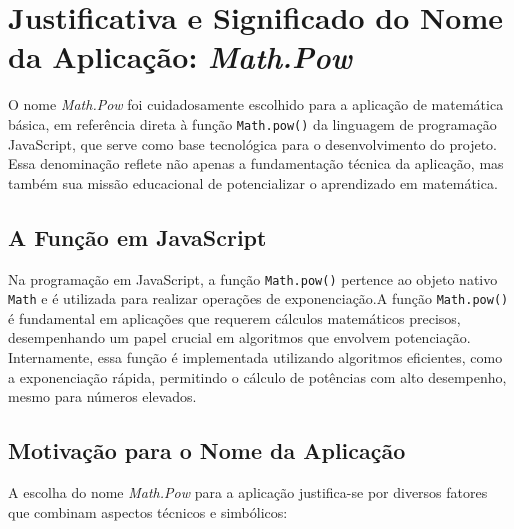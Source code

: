 \section{Justificativa e Significado do Nome da Aplicação: \textit{Math.Pow}} 

O nome \textit{Math.Pow} foi cuidadosamente escolhido para a aplicação de matemática básica, em referência direta à função \texttt{Math.pow()} da linguagem de programação JavaScript, que serve como base tecnológica para o desenvolvimento do projeto. Essa denominação reflete não apenas a fundamentação técnica da aplicação, mas também sua missão educacional de potencializar o aprendizado em matemática.

\subsection{A Função  em JavaScript}

Na programação em JavaScript, a função \texttt{Math.pow()} pertence ao objeto nativo \texttt{Math} e é utilizada para realizar operações de exponenciação.A função \texttt{Math.pow()} é fundamental em aplicações que requerem cálculos matemáticos precisos, desempenhando um papel crucial em algoritmos que envolvem potenciação. Internamente, essa função é implementada utilizando algoritmos eficientes, como a exponenciação rápida, permitindo o cálculo de potências com alto desempenho, mesmo para números elevados.

\subsection{Motivação para o Nome da Aplicação}

A escolha do nome \textit{Math.Pow} para a aplicação justifica-se por diversos fatores que combinam aspectos técnicos e simbólicos:

